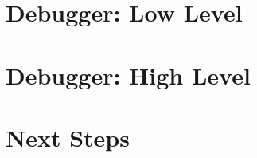 \documentclass[12pt]{article}
\begin{document}
\section{Debugger: Low Level}

\section{Debugger: High Level}

\section{Next Steps}

\pagebreak

{}
\end{document}
